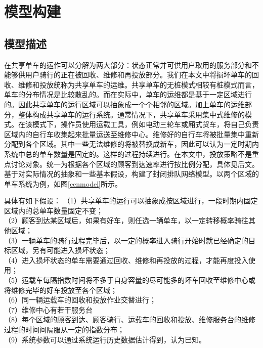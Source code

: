 \documentclass{article}
\begin{document}



\section{模型构建}
\subsection{模型描述}
在共享单车的运作可以分解为两大部分：状态正常并可供用户取用的服务部分和不能够供用户骑行的正在被回收、维修和再投放部分。我们在本文中将损坏单车的回收、维修和投放统称为共享单车的运维。共享单车的无桩模式相较有桩模式而言，单车的分布情况是比较散乱的。而在实际中，单车的运维都是基于一定区域进行的。因此共享单车的运行区域可以抽象成一个个相邻的区域。加上单车的运维部分，整体构成共享单车的运行系统。通常情况下，共享单车采用集中式维修的模式。在该模式下，操作员使用运载工具，例如电动三轮车或厢式货车，将自己负责区域内的自行车收集起来批量运送至维修中心。维修好的自行车将被批量集中重新分配到各个区域。其中一些无法维修的将被替换成新车，因此可以认为一定时期内系统中总的单车数量是固定的。这样的过程持续进行。在本文中，投放策略不是重点讨论对象。统一为根据各个区域的顾客到达速率进行按比例分配，具体见后文。基于对实际情况的抽象和一些基本假设，构建了封闭排队网络模型。以两个区域的单车系统为例，如图\ref{cenmodel}所示。

具体有如下假设：
（1）共享单车的运行可以抽象成按区域进行，一段时期内固定区域内的总单车数量固定不变；\\
（2）顾客到达某区域后，如果有好车，则任选一辆单车，以一定转移概率骑往其他区域；\\
（3）一辆单车的骑行过程完毕后，以一定的概率进入骑行开始时就已经确定的目标区域，另有可能进入损坏状态；\\
（4）进入损坏状态的单车需要通过回收、维修和再投放的过程，才能再度投入使用；\\
（5）运载车每隔指数时间将不多于自身容量的尽可能多的坏车回收至维修中心或将维修完毕的好车投放至各个区域；\\
（6）同一辆运载车的回收和投放作业交替进行；\\
（7）维修中心有若干服务台\\
（8）每个区域的顾客到达、顾客骑行、运载车的回收和投放、维修服务台的维修过程的时间间隔服从一定的指数分布；\\
（9）系统参数可以通过系统运行历史数据估计得到，认为已知。
\end{document}
